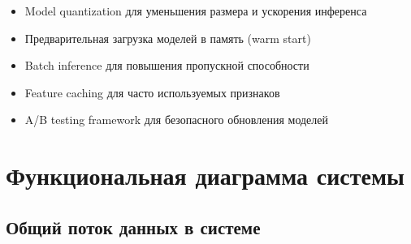 \documentclass[a4paper,11pt]{article}
\begin{document}
\begin{itemize}
    \item Model quantization для уменьшения размера и ускорения инференса
    \item Предварительная загрузка моделей в память (warm start)
    \item Batch inference для повышения пропускной способности
    \item Feature caching для часто используемых признаков
    \item A/B testing framework для безопасного обновления моделей
\end{itemize}

\newpage

\section{Функциональная диаграмма системы}

\subsection{Общий поток данных в системе}
\end{document}
